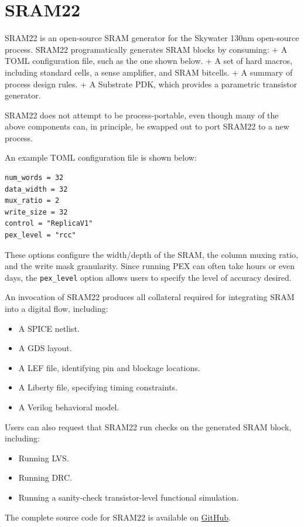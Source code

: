 \chapter{SRAM22}

SRAM22 is an open-source SRAM generator for the Skywater 130nm open-source process.
SRAM22 programatically generates SRAM blocks by consuming:
+ A TOML configuration file, such as the one shown below.
+ A set of hard macros, including standard cells, a sense amplifier, and SRAM bitcells.
+ A summary of process design rules.
+ A Substrate PDK, which provides a parametric transistor generator.

SRAM22 does not attempt to be process-portable, even though many of the above components
can, in principle, be swapped out to port SRAM22 to a new process.

An example TOML configuration file is shown below:

\begin{verbatim}
num_words = 32
data_width = 32
mux_ratio = 2
write_size = 32
control = "ReplicaV1"
pex_level = "rcc"
\end{verbatim}

These options configure the width/depth of the SRAM, the column muxing ratio, and the write mask granularity.
Since running PEX can often take hours or even days, the \verb|pex_level| option allows users to specify
the level of accuracy desired.

An invocation of SRAM22 produces all collateral required for integrating SRAM into a digital flow, including:
\begin{itemize}
\item A SPICE netlist.
\item A GDS layout.
\item A LEF file, identifying pin and blockage locations.
\item A Liberty file, specifying timing constraints.
\item A Verilog behavioral model.
\end{itemize}

Users can also request that SRAM22 run checks on the generated SRAM block, including:
\begin{itemize}
\item Running LVS.
\item Running DRC.
\item Running a sanity-check transistor-level functional simulation.
\end{itemize}

The complete source code for SRAM22 is available on \href{https://github.com/rahulk29/sram22}{GitHub}.

